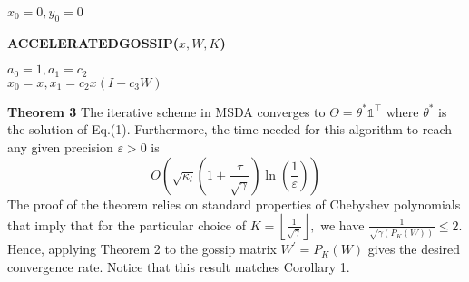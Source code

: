 \documentclass[12pt]{article}
\begin{document}
\begin{algorithm}[H]
	\SetAlgoLined
	$x _ { 0 } = 0 , y _ { 0 } = 0$\\
	
\end{algorithm}
\medskip

\noindent\textbf{ACCELERATEDGOSSIP($x , W , K$)}

\begin{algorithm}[H]
	$a _ { 0 } = 1 , a _ { 1 } = c _ { 2 }$\\
	$x _ { 0 } = x , x _ { 1 } = c _ { 2 } x \left( I - c _ { 3 } W \right)$
\end{algorithm}

\noindent\textbf{Theorem 3}
The iterative scheme in MSDA converges to $\Theta = \theta ^ { * } \mathbb { 1 } ^ { \top }$ where $\theta ^ { * }$ is the solution of
Eq.(1). Furthermore, the time needed for this algorithm to reach any given precision $\varepsilon > 0$ is
$$
O \left( \sqrt { \kappa _ { l } } \left( 1 + \frac { \tau } { \sqrt { \gamma } } \right) \ln \left( \frac { 1 } { \varepsilon } \right) \right)
$$
The proof of the theorem relies on standard properties of Chebyshev polynomials that imply that for
the particular choice of $K = \left\lfloor \frac { 1 } { \sqrt { \gamma } } \right\rfloor ,$ we have $\frac { 1 } { \sqrt { \gamma \left( P _ { K } ( W ) \right) }} \leq 2$. Hence, applying Theorem  2 to the
gossip matrix $W ^ { \prime } = P _ { K } ( W )$ gives the desired convergence rate. Notice that this result matches Corollary 1.
\newline
\newline
\newline
\end{document}

